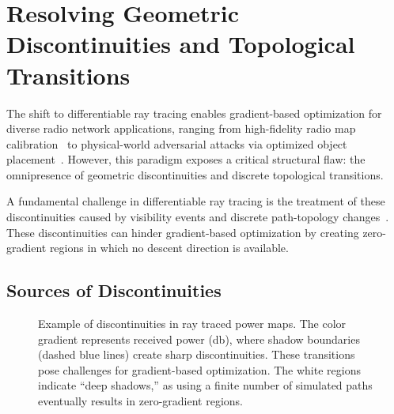 \begin{listing}
  \ContinuedFloat
  \caption{Example of implicit differentiation for the Fermat-based path tracing method in its convex setting (continued). First, the static parameters are ignored to emphasize that the optimal path does not depend on these parameters. Next, the results from the forward pass are unpacked. The gradient of the objective is obtained with \texttt{jax.grad}, and the Hessian is obtained with \texttt{jax.hessian}. Finally, a linear solve is performed to compute the vector--Jacobian product without unrolling the optimization trajectory. The Hessian's positive semi-definiteness is leveraged to employ a more efficient linear solver.}
  \inputminted[firstline=36,lastline=69]{python}{codes/jax-implicit-diff.py}
\end{listing}

\section{Resolving Geometric Discontinuities and Topological Transitions}

The shift to differentiable ray tracing enables gradient-based optimization for diverse radio network applications, ranging from high-fidelity radio map calibration~ to physical-world adversarial attacks via optimized object placement~. However, this paradigm exposes a critical structural flaw: the omnipresence of geometric discontinuities and discrete topological transitions.

A fundamental challenge in differentiable ray tracing is the treatment of these discontinuities caused by visibility events and discrete path-topology changes~. These discontinuities can hinder gradient-based optimization by creating zero-gradient regions in which no descent direction is available.

\subsection{Sources of Discontinuities}

\begin{figure}
  \centering
  \caption{Example of discontinuities in ray traced power maps. The color gradient represents received power (\unit{\decibel}), where shadow boundaries (dashed blue lines) create sharp discontinuities. These transitions pose challenges for gradient-based optimization. The white regions indicate \enquote{deep shadows,} as using a finite number of simulated paths eventually results in zero-gradient regions.}
\end{figure}


